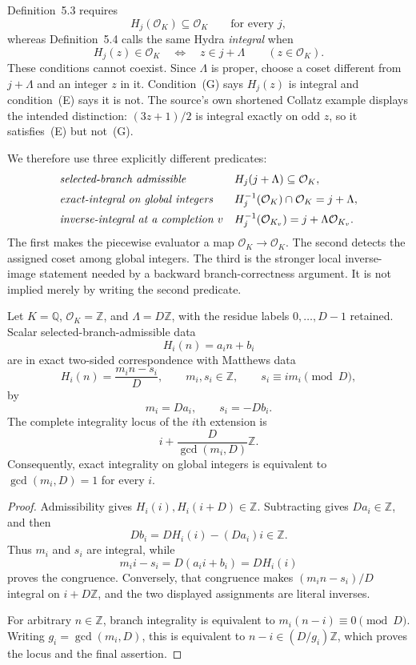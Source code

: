 \begin{sourceissue}
\label{issue:Siegel-Hydra-integrality}
Definition~5.3 requires
\[
 H_j(\mathcal O_K)\subseteq\mathcal O_K
 \qquad\text{for every }j,
\tag{G}
\]
whereas Definition~5.4 calls the same Hydra \emph{integral} when
\[
 H_j(z)\in\mathcal O_K
 \quad\Longleftrightarrow\quad z\in j+\Lambda
 \qquad(z\in\mathcal O_K).
\tag{E}
\]
These conditions cannot coexist.  Since $\Lambda$ is proper, choose a coset
different from $j+\Lambda$ and an integer $z$ in it.  Condition~(G) says
$H_j(z)$ is integral and condition~(E) says it is not.  The source's own
shortened Collatz example displays the intended distinction:
$(3z+1)/2$ is integral exactly on odd $z$, so it satisfies~(E) but not~(G).
\end{sourceissue}

We therefore use three explicitly different predicates:
\[
\begin{array}{ll}
\text{\emph{selected-branch admissible}}&
 H_j(j+\Lambda)\subseteq\mathcal O_K,\\[2mm]
\text{\emph{exact-integral on global integers}}&
 H_j^{-1}(\mathcal O_K)\cap\mathcal O_K=j+\Lambda,\\[2mm]
\text{\emph{inverse-integral at a completion $v$}}&
 H_j^{-1}(\mathcal O_{K_v})=j+\Lambda\mathcal O_{K_v}.
\end{array}
\]
The first makes the piecewise evaluator a map
$\mathcal O_K\to\mathcal O_K$.  The second detects the assigned coset among
global integers.  The third is the stronger local inverse-image statement
needed by a backward branch-correctness argument.  It is not implied merely
by writing the second predicate.

\begin{proposition}
\label{prop:Siegel-scalar-Hydra-Matthews}
Let $K=\mathbb Q$, $\mathcal O_K=\mathbb Z$, and
$\Lambda=D\mathbb Z$, with the residue labels $0,\ldots,D-1$ retained.
Scalar selected-branch-admissible data
\[
 H_i(n)=a_i n+b_i
\]
are in exact two-sided correspondence with Matthews data
\[
 H_i(n)=\frac{m_i n-s_i}{D},
 \qquad m_i,s_i\in\mathbb Z,\qquad
 s_i\equiv i m_i\pmod D,
\]
by
\[
 m_i=Da_i,\qquad s_i=-Db_i.
\]
The complete integrality locus of the $i$th extension is
\[
 i+\frac{D}{\gcd(m_i,D)}\mathbb Z.
\]
Consequently, exact integrality on global integers is equivalent to
$\gcd(m_i,D)=1$ for every $i$.
\end{proposition}

\begin{proof}
Admissibility gives $H_i(i),H_i(i+D)\in\mathbb Z$.  Subtracting gives
$Da_i\in\mathbb Z$, and then
\[
 Db_i=D H_i(i)-(Da_i)i\in\mathbb Z.
\]
Thus $m_i$ and $s_i$ are integral, while
\[
 m_i i-s_i=D(a_i i+b_i)=D H_i(i)
\]
proves the congruence.  Conversely, that congruence makes
$(m_i n-s_i)/D$ integral on $i+D\mathbb Z$, and the two displayed
assignments are literal inverses.

For arbitrary $n\in\mathbb Z$, branch integrality is equivalent to
$m_i(n-i)\equiv0\pmod D$.  Writing $g_i=\gcd(m_i,D)$, this is equivalent to
$n-i\in(D/g_i)\mathbb Z$, which proves the locus and the final assertion.
\end{proof}

